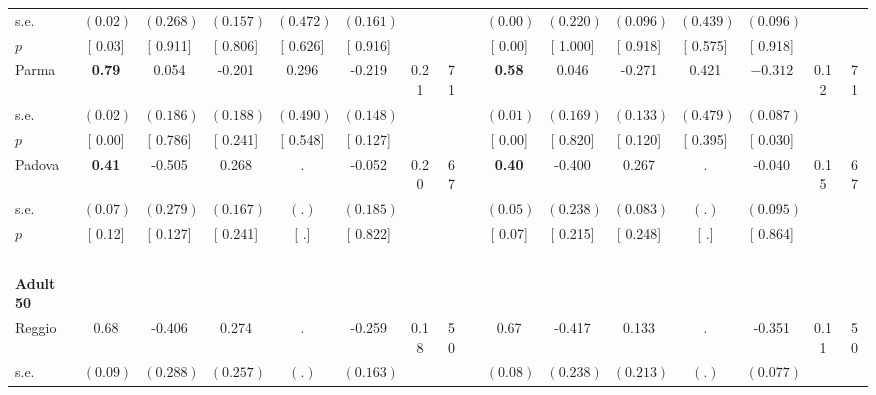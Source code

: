 \begin{longtable}{L{8em} c c c c c c c p{1em} c c c c c c c}
\quad \quad \quad \quad s.e.& $ (     0.02)$ & $ (    0.268)$ & $ (    0.157)$ & $ (    0.472)$ & $ (    0.161)$ & & & & $ (     0.00)$ & $ (    0.220)$ & $ (    0.096)$ & $ (    0.439)$ & $ (    0.096)$ & &  \\*
\quad \quad \quad \quad $ p$ & [     0.03] & [    0.911] & [    0.806] & [    0.626] & [    0.916] & & & & [     0.00] & [    1.000] & [    0.918] & [    0.575] & [    0.918] & &  \\[1em]
\quad \quad \quad Parma& \textbf{     0.79} &     0.054 &    -0.201 &     0.296 &    -0.219 &      0.21 &        71 & & \textbf{     0.58} &     0.046 &    -0.271 &     0.421 & $ \mathbf{   -0.312}$ &      0.12 &        71  \\*
\quad \quad \quad \quad s.e.& $ (     0.02)$ & $ (    0.186)$ & $ (    0.188)$ & $ (    0.490)$ & $ (    0.148)$ & & & & $ (     0.01)$ & $ (    0.169)$ & $ (    0.133)$ & $ (    0.479)$ & $ (    0.087)$ & &  \\*
\quad \quad \quad \quad $ p$ & [     0.00] & [    0.786] & [    0.241] & [    0.548] & [    0.127] & & & & [     0.00] & [    0.820] & [    0.120] & [    0.395] & [    0.030] & &  \\[1em]
\quad \quad \quad Padova& \textbf{     0.41} &    -0.505 &     0.268 &         . &    -0.052 &      0.20 &        67 & & \textbf{     0.40} &    -0.400 &     0.267 &         . &    -0.040 &      0.15 &        67  \\*
\quad \quad \quad \quad s.e.& $ (     0.07)$ & $ (    0.279)$ & $ (    0.167)$ & $ (        .)$ & $ (    0.185)$ & & & & $ (     0.05)$ & $ (    0.238)$ & $ (    0.083)$ & $ (        .)$ & $ (    0.095)$ & &  \\*
\quad \quad \quad \quad $ p$ & [     0.12] & [    0.127] & [    0.241] & [        .] & [    0.822] & & & & [     0.07] & [    0.215] & [    0.248] & [        .] & [    0.864] & &  \\[1em]
~\\[1em]
\quad \quad \textbf{Adult 50} & & & & & & & & & & & & & & & \\* 
\quad \quad \quad Reggio& 0.68 &    -0.406 &     0.274 &         . &    -0.259 &      0.18 &        50 & & 0.67 &    -0.417 &     0.133 &         . &    -0.351 &      0.11 &        50  \\*
\quad \quad \quad \quad s.e.& $ (     0.09)$ & $ (    0.288)$ & $ (    0.257)$ & $ (        .)$ & $ (    0.163)$ & & & & $ (     0.08)$ & $ (    0.238)$ & $ (    0.213)$ & $ (        .)$ & $ (    0.077)$ & &  \\*

\end{longtable}
